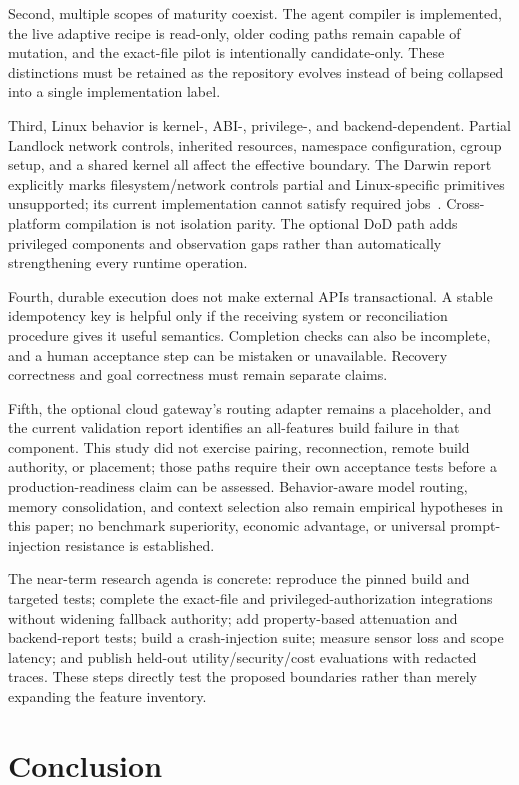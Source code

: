 Second, multiple scopes of maturity coexist. The agent compiler is implemented, the live adaptive recipe is read-only, older coding paths remain capable of mutation, and the exact-file pilot is intentionally candidate-only. These distinctions must be retained as the repository evolves instead of being collapsed into a single implementation label.

Third, Linux behavior is kernel-, ABI-, privilege-, and backend-dependent. Partial Landlock network controls, inherited resources, namespace configuration, cgroup setup, and a shared kernel all affect the effective boundary. The Darwin report explicitly marks filesystem/network controls partial and Linux-specific primitives unsupported; its current implementation cannot satisfy required jobs~\cite{ref58}. Cross-platform compilation is not isolation parity. The optional DoD path adds privileged components and observation gaps rather than automatically strengthening every runtime operation.

Fourth, durable execution does not make external APIs transactional. A stable idempotency key is helpful only if the receiving system or reconciliation procedure gives it useful semantics. Completion checks can also be incomplete, and a human acceptance step can be mistaken or unavailable. Recovery correctness and goal correctness must remain separate claims.

Fifth, the optional cloud gateway's routing adapter remains a placeholder, and the current validation report identifies an all-features build failure in that component. This study did not exercise pairing, reconnection, remote build authority, or placement; those paths require their own acceptance tests before a production-readiness claim can be assessed. Behavior-aware model routing, memory consolidation, and context selection also remain empirical hypotheses in this paper; no benchmark superiority, economic advantage, or universal prompt-injection resistance is established.

The near-term research agenda is concrete: reproduce the pinned build and targeted tests; complete the exact-file and privileged-authorization integrations without widening fallback authority; add property-based attenuation and backend-report tests; build a crash-injection suite; measure sensor loss and scope latency; and publish held-out utility/security/cost evaluations with redacted traces. These steps directly test the proposed boundaries rather than merely expanding the feature inventory.

\section{Conclusion}
\label{sec:conclusion}

